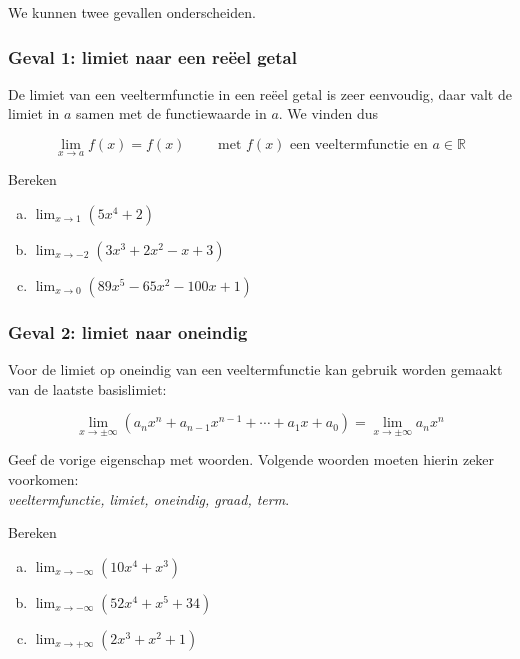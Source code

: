 \documentclass[12pt]{article}
\newenvironment{eigenschap}
{
  \vspace{0.4cm}
  \begin{mdframed}[nobreak=true,frametitle={Eigenschap}]
  }{%
  \end{mdframed}
}
\begin{document}
We kunnen twee gevallen onderscheiden.

\subsubsection*{Geval 1: limiet naar een reëel getal}

De limiet van een veeltermfunctie in een reëel getal is zeer eenvoudig, daar valt de limiet in $a$ samen met de functiewaarde in $a$. We vinden dus

\begin{eigenschap}
  $$\lim_{x\to a}f(x)=f(x) \qquad \mbox{ met $f(x)$ een veeltermfunctie en $a\in\mathbb{R}$}$$
\end{eigenschap}

\begin{oefening}
  Bereken
  \begin{enumerate}[(a)]
  \item $\displaystyle\lim_{x\to1}\left(5x^4+2\right)$
  \item $\displaystyle\lim_{x\to-2}\left(3x^3+2x^2-x+3\right)$
  \item $\displaystyle\lim_{x\to0}\left(89x^5-65x^2-100x+1\right)$
  \end{enumerate}
\end{oefening}

\subsubsection*{Geval 2: limiet naar oneindig}

Voor de limiet op oneindig van een veeltermfunctie kan gebruik worden gemaakt van de laatste basislimiet:

\begin{eigenschap}
  $$\lim_{x\to\pm\infty}\left(a_nx^n+a_{n-1}x^{n-1}+\cdots+a_1x+a_0\right) = \lim_{x\to\pm\infty}a_nx^n$$
\end{eigenschap}

\begin{oefening}
  Geef de vorige eigenschap met woorden. Volgende woorden moeten hierin zeker voorkomen:\\
  {\em veeltermfunctie, limiet, oneindig, graad, term}.
\end{oefening}

\begin{oefening}
  Bereken
  \begin{enumerate}[(a)]
  \item $\displaystyle\lim_{x\to-\infty}\left(10x^4+x^3\right)$
  \item $\displaystyle\lim_{x\to-\infty}\left(52x^4+x^5+34\right)$
  \item $\displaystyle\lim_{x\to+\infty}\left(2x^3+x^2+1\right)$
  \end{enumerate}
\end{oefening}
\end{document}
